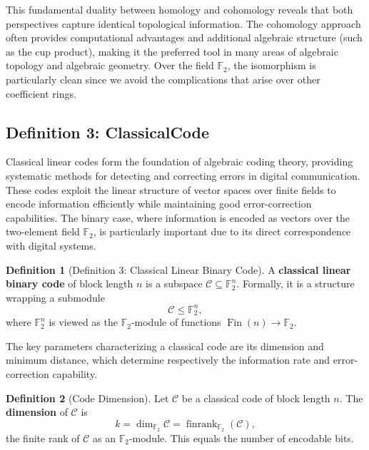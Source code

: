 \documentclass[11pt]{article}
\theoremstyle{plain}
\theoremstyle{definition}
\newtheorem*{definition}{Definition}
\theoremstyle{remark}
\begin{document}
This fundamental duality between homology and cohomology reveals that both perspectives capture identical topological information. The cohomology approach often provides computational advantages and additional algebraic structure (such as the cup product), making it the preferred tool in many areas of algebraic topology and algebraic geometry. Over the field $\mathbb{F}_2$, the isomorphism is particularly clean since we avoid the complications that arise over other coefficient rings.

\vspace{1em}

\subsection{Definition 3: ClassicalCode}

Classical linear codes form the foundation of algebraic coding theory, providing systematic methods for detecting and correcting errors in digital communication. These codes exploit the linear structure of vector spaces over finite fields to encode information efficiently while maintaining good error-correction capabilities. The binary case, where information is encoded as vectors over the two-element field $\mathbb{F}_2$, is particularly important due to its direct correspondence with digital systems.

\begin{definition}[Definition 3: Classical Linear Binary Code]
A \textbf{classical linear binary code} of block length $n$ is a subspace $\mathcal{C} \subseteq \mathbb{F}_2^n$. Formally, it is a structure wrapping a submodule
\[
\mathcal{C} \leq \mathbb{F}_2^n,
\]
where $\mathbb{F}_2^n$ is viewed as the $\mathbb{F}_2$-module of functions $\operatorname{Fin}(n) \to \mathbb{F}_2$.
\end{definition}

The key parameters characterizing a classical code are its dimension and minimum distance, which determine respectively the information rate and error-correction capability.

\begin{definition}[Code Dimension]
Let $\mathcal{C}$ be a classical code of block length $n$. The \textbf{dimension} of $\mathcal{C}$ is
\[
k = \dim_{\mathbb{F}_2} \mathcal{C} = \operatorname{finrank}_{\mathbb{F}_2}(\mathcal{C}),
\]
the finite rank of $\mathcal{C}$ as an $\mathbb{F}_2$-module. This equals the number of encodable bits.
\end{definition}
\end{document}
